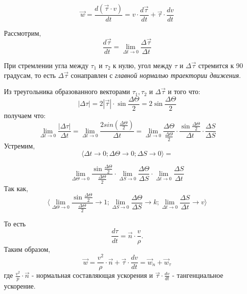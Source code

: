 \begin{enumerate}
\begin{enumerate}
                    \[\vec w = \frac{d(\vec \tau \cdot v)}{dt} = v\cdot \frac{d \vec \tau}{dt} + \vec \tau\cdot \frac{dv}{dt}\]

                    Рассмотрим, \[ \frac{d \vec \tau}{dt} = \lim_{\Delta t \to 0}  \frac{\Delta \vec \tau}{\Delta t}\]

                    При стремлении угла между $\tau_1$ и $\tau_2$ к нулю, угол между $\tau$ и $\Delta \vec \tau$ стремится к 90 градусам, то есть $\Delta \vec \tau$ сонаправлен с \textit{главной нормалью траектории движения}.

                    Из треугольника образованного векторами $\tau_1, \tau_2$ и $\Delta \vec \tau$ и того что:
                    \[|\Delta \tau| = 2 |\vec \tau| \cdot \sin{\frac{\Delta \Theta}{2}} = 2\sin{\frac{\Delta \Theta}{2}}\]
                    получаем что: \[ \lim_{\Delta t \to 0}  \frac{|\Delta \tau|}{\Delta t} = \lim_{\Delta t \to 0}  \frac{2sin(\frac{\Delta \Theta}{2})}{\Delta t} =
                        \lim_{\Delta t \to 0}  \frac{\Delta \Theta}{\frac{\Delta \Theta}{2}}\cdot\frac{\sin{\frac{\Delta \Theta}{2}}}{\Delta t}\cdot\frac{\Delta S}{\Delta S} \]
                    Устремим,
                    \[ \langle \Delta t \to 0 ;\Delta \Theta \to 0; \Delta S \to 0 \rangle = \]

                    \[ \lim_{\Delta \Theta \to 0}  \frac{\sin{\frac{\Delta \Theta}{2}}}{\frac{\Delta \Theta}{2}} \cdot \lim_{\Delta S \to 0} \frac{\Delta \Theta}{\Delta S} \cdot \lim_{\Delta t \to 0} \frac{\Delta S}{\Delta t} \]
                    Так как,
                    \[ \langle \lim_{\Delta \Theta \to 0}  \frac{\sin{\frac{\Delta \Theta}{2}}}{\frac{\Delta \Theta}{2}} \to 1 ; \lim_{\Delta S \to 0} \frac{\Delta \Theta}{\Delta S} \to k; \lim_{\Delta t \to 0} \frac{\Delta S}{\Delta t} \to v \rangle \]

                    \vspace{5px}

                    То есть \[\frac{d \tau}{dt} = \vec n \cdot \frac{v}{\rho}. \]
                    Таким образом,\[ \vec w = \frac{v^2}{\rho} \cdot \vec n + \vec \tau \cdot \frac{dv}{dt} = \vec w_n + \vec w_\tau \]где $\frac{v^2}{p} \cdot \vec n$  - нормальная составляющая ускорения и $\vec \tau \cdot \frac{dv}{dt}$ - тангенциальное ускорение.


\end{enumerate}
\end{enumerate}
